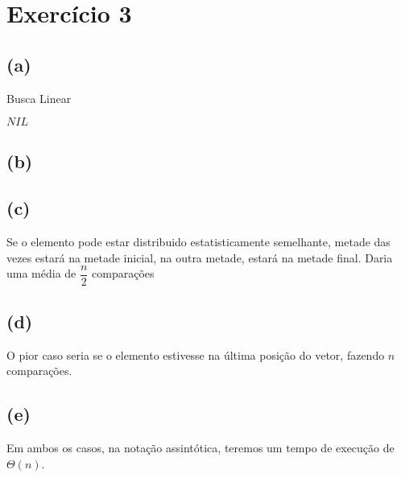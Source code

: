\documentclass{article}
\begin{document}
\section{Exercício 3}
\subsection*{(a)}
    \begin{algorithm}
    \caption{Busca Linear}
    \Return $NIL$
    \end{algorithm}
\subsection*{(b)}
    

\subsection*{(c)}
    Se o elemento pode estar distribuido estatisticamente semelhante, metade das vezes estará na metade inicial, na outra metade, estará na metade final. Daria uma média 
    de $\dfrac{n}{2}$ comparações

\subsection*{(d)}
    O pior caso seria se o elemento estivesse na última posição do vetor, fazendo $n$ 
    comparações. 

\subsection*{(e)}
    Em ambos os casos, na notação assintótica, teremos um tempo de execução de $\Theta(n)$.
\end{document}
